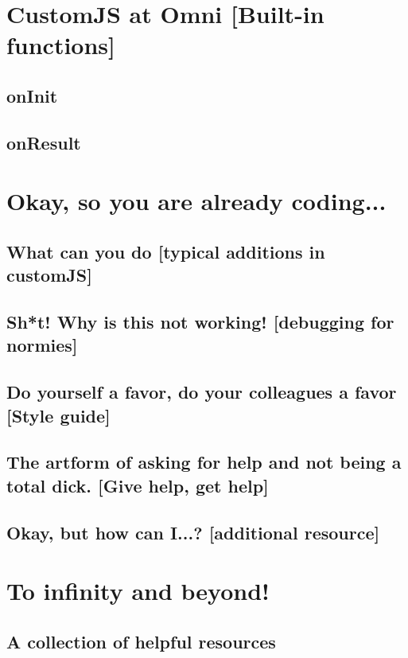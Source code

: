 \documentclass[11pt,a4paper,oldfontcommands]{memoir}
\begin{document}
\chapter{CustomJS at Omni \small{[Built-in functions]}}
    \label{chap:omni}
    
    \section{onInit}
    \label{sec:onInit}
    
    
    \section{onResult}
    \label{sec:onResult}
    

\chapter{Okay, so you are already coding...}
    \label{chap:coding}

    \section{What can you do \small{[typical additions in customJS]}}
    \label{sec:whatDo}
    
    
    \section{Sh*t! Why is this not working! \small{[debugging for normies]}}
    \label{sec:debug}
    
    
    \section{Do yourself a favor, do your colleagues a favor \small{[Style guide]}}
    \label{sec:style}
    
    
    \section{The artform of asking for help and not being a total dick. \small{[Give help, get help]}}
    \label{sec:help}
    
    

\section{Okay, but how can I...? \small{[additional resource]}}


\appendix

\chapter{To infinity and beyond!}
\section{A collection of helpful resources}




\end{document}
